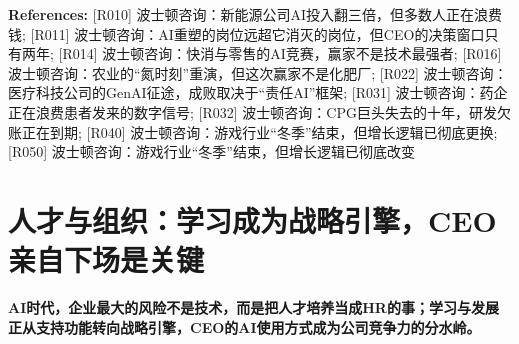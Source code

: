 \documentclass[11pt]{ctexart}
\begin{document}
{\small\color{refgray}\textbf{References:} [R010] 波士顿咨询：新能源公司AI投入翻三倍，但多数人正在浪费钱; [R011] 波士顿咨询：AI重塑的岗位远超它消灭的岗位，但CEO的决策窗口只有两年; [R014] 波士顿咨询：快消与零售的AI竞赛，赢家不是技术最强者; [R016] 波士顿咨询：农业的“氮时刻”重演，但这次赢家不是化肥厂; [R022] 波士顿咨询：医疗科技公司的GenAI征途，成败取决于“责任AI”框架; [R031] 波士顿咨询：药企正在浪费患者发来的数字信号; [R032] 波士顿咨询：CPG巨头失去的十年，研发欠账正在到期; [R040] 波士顿咨询：游戏行业“冬季”结束，但增长逻辑已彻底更换; [R050] 波士顿咨询：游戏行业“冬季”结束，但增长逻辑已彻底改变}

\section{人才与组织：学习成为战略引擎，CEO亲自下场是关键}
\textbf{AI时代，企业最大的风险不是技术，而是把人才培养当成HR的事；学习与发展正从支持功能转向战略引擎，CEO的AI使用方式成为公司竞争力的分水岭。}
\end{document}
